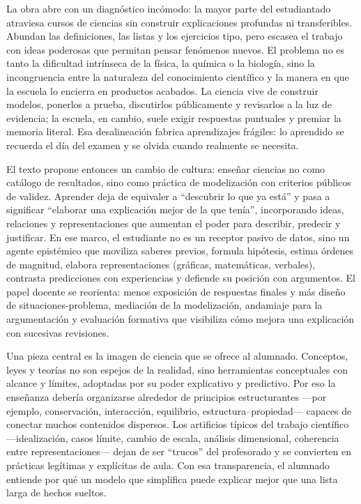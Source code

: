 \documentclass{article}
\begin{document}
\begin{tcolorbox}[enhanced,breakable,
  colback=white, colframe=black, boxrule=0.8pt,
  left=6mm,right=6mm,top=3mm,bottom=3mm,
  title={\large \textbf{Resumen narrativo}}]

La obra abre con un diagnóstico incómodo: la mayor parte del estudiantado atraviesa cursos de ciencias sin construir explicaciones profundas ni transferibles. Abundan las definiciones, las listas y los ejercicios tipo, pero escasea el trabajo con ideas poderosas que permitan pensar fenómenos nuevos. El problema no es tanto la dificultad intrínseca de la física, la química o la biología, sino la incongruencia entre la naturaleza del conocimiento científico y la manera en que la escuela lo encierra en productos acabados. La ciencia vive de construir modelos, ponerlos a prueba, discutirlos públicamente y revisarlos a la luz de evidencia; la escuela, en cambio, suele exigir respuestas puntuales y premiar la memoria literal. Esa desalineación fabrica aprendizajes frágiles: lo aprendido se recuerda el día del examen y se olvida cuando realmente se necesita.

El texto propone entonces un cambio de cultura: enseñar ciencias no como catálogo de resultados, sino como práctica de modelización con criterios públicos de validez. Aprender deja de equivaler a “descubrir lo que ya está” y pasa a significar “elaborar una explicación mejor de la que tenía”, incorporando ideas, relaciones y representaciones que aumentan el poder para describir, predecir y justificar. En ese marco, el estudiante no es un receptor pasivo de datos, sino un agente epistémico que moviliza saberes previos, formula hipótesis, estima órdenes de magnitud, elabora representaciones (gráficas, matemáticas, verbales), contrasta predicciones con experiencias y defiende su posición con argumentos. El papel docente se reorienta: menos exposición de respuestas finales y más diseño de situaciones-problema, mediación de la modelización, andamiaje para la argumentación y evaluación formativa que visibiliza cómo mejora una explicación con sucesivas revisiones.

Una pieza central es la imagen de ciencia que se ofrece al alumnado. Conceptos, leyes y teorías no son espejos de la realidad, sino herramientas conceptuales con alcance y límites, adoptadas por su poder explicativo y predictivo. Por eso la enseñanza debería organizarse alrededor de principios estructurantes —por ejemplo, conservación, interacción, equilibrio, estructura–propiedad— capaces de conectar muchos contenidos dispersos. Los artificios típicos del trabajo científico —idealización, casos límite, cambio de escala, análisis dimensional, coherencia entre representaciones— dejan de ser “trucos” del profesorado y se convierten en prácticas legítimas y explícitas de aula. Con esa transparencia, el alumnado entiende por qué un modelo que simplifica puede explicar mejor que una lista larga de hechos sueltos.


\end{tcolorbox}
\end{document}
